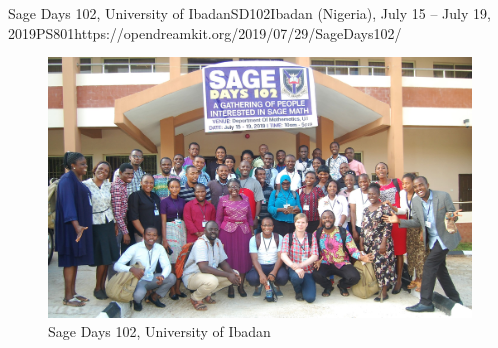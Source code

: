 \begin{event}{Sage Days 102, University of Ibadan}{SD102}{Ibadan (Nigeria), July 15 -- July 19, 2019}{PS}{80}{1}{https://opendreamkit.org/2019/07/29/SageDays102/}
\begin{figure}[ht]
\includegraphics[scale=.5]{days102_group.jpg}
\caption*{Sage Days 102, University of Ibadan}
\end{figure}



\end{event}
